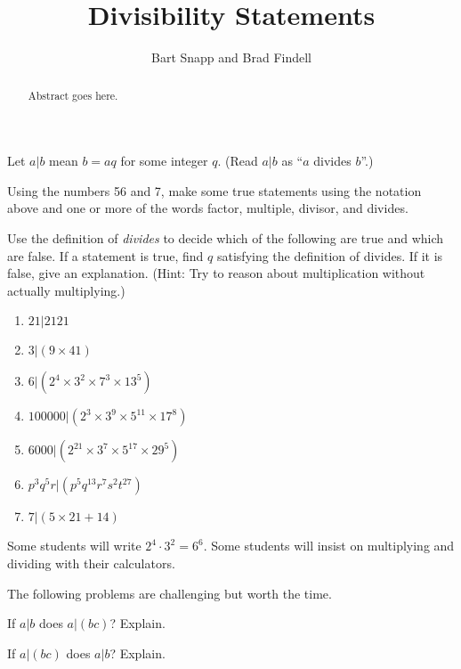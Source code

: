\documentclass{ximera}
\title{Divisibility Statements}
\author{Bart Snapp and Brad Findell}
\begin{document}
\begin{abstract}
Abstract goes here.  
\end{abstract}
\maketitle

\label{A:divisibilityStatements}

Let $a|b$ mean $b=aq$ for some integer $q$.  (Read $a|b$ as ``$a$ divides $b$''.)  

\begin{problem}
Using the numbers 56 and 7, make some true statements using the notation above and one or more of the words factor, multiple, divisor, and divides.  
\end{problem}

\begin{problem}
Use the definition of \emph{divides} to decide which of the following are true and which are false.  If a statement is true, find $q$ satisfying the definition of divides.  If it is false, give an explanation.  (Hint:  Try to reason about multiplication without actually multiplying.)
\begin{enumerate}
\item $21|2121$
\item $3|(9\times 41)$
\item $6|(2^4\times 3^2\times 7^3\times 13^5)$
\item $100000|(2^3\times 3^9\times 5^{11}\times 17^8)$
\item $6000|(2^{21}\times 3^7 \times 5^{17}\times 29^5)$
\item $p^3q^5r|(p^5q^{13}r^7s^2t^{27})$
\item $7|(5\times 21 + 14)$
\end{enumerate}
\end{problem}

\begin{teachingnote}
Some students will write $2^4\cdot 3^2=6^6$.  Some students will insist on multiplying and dividing with their calculators. 

The following problems are challenging but worth the time.
\end{teachingnote}

\begin{problem}
If $a|b$ does $a|(bc)$?  Explain. 
\end{problem}

\begin{problem}
If $a|(bc)$ does $a|b$?  Explain. 
\end{problem}
\end{document}
